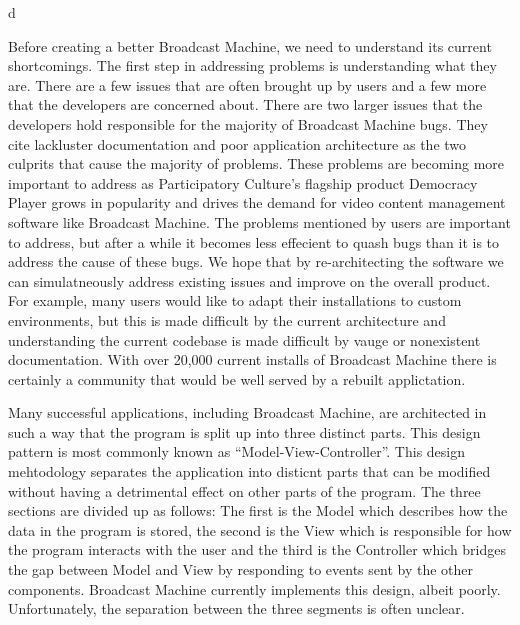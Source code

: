 d\documentclass[a4paper,12pt]{report}
\begin{document}
Before creating a better Broadcast Machine, we need to understand its current shortcomings.
The first step in addressing problems is understanding what they are. There are a few issues that are often brought up by users and a few more that the developers are concerned about.
There are two larger issues that the developers hold responsible for the majority of Broadcast Machine bugs.
They cite  lackluster documentation and poor application architecture as the two culprits that cause the majority of problems. These problems are becoming more important to address as Participatory Culture's flagship product Democracy Player grows in popularity and drives the demand for video content management software like Broadcast Machine. The problems mentioned by users are important to address, but after a while it becomes less effecient to quash bugs than it is to address the cause of these bugs. We hope that by re-architecting the software we can simulatneously address existing issues and improve on the overall product.
For example, many users would like to adapt their installations to custom environments, but this is made difficult by the current architecture and understanding the current codebase is made difficult by vauge or nonexistent documentation. With over 20,000 current installs of Broadcast Machine there is certainly a community that would be well served by a rebuilt applictation. \footnotemark

Many successful applications, including Broadcast Machine, are architected in such a way that the program is split up into three distinct parts. This design pattern is most commonly known as ``Model-View-Controller''. This design mehtodology separates the application into disticnt parts that can be modified without having a detrimental effect on other parts of the program. The three sections are divided up as follows: The first is the Model which describes how the data in the program is stored, the second is the View which is responsible for how the program interacts with the user and the third is the Controller which bridges the gap between Model and View by responding to events sent by the other components. Broadcast Machine currently implements this design, albeit poorly. Unfortunately, the separation between the three segments is often unclear.
\end{document}
